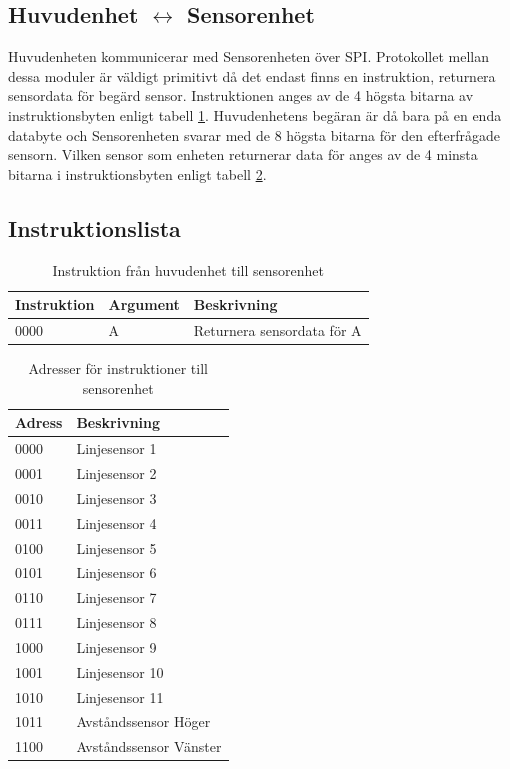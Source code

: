 \subsection{Huvudenhet $\longleftrightarrow$ Sensorenhet}

Huvudenheten kommunicerar med Sensorenheten över SPI. Protokollet mellan dessa moduler är väldigt primitivt då det endast finns en instruktion, returnera sensordata för begärd sensor. Instruktionen anges av de 4 högsta bitarna av instruktionsbyten enligt tabell \ref{protokoll:huvud-sensor}. Huvudenhetens begäran är då bara på en enda databyte och Sensorenheten svarar med de 8 högsta bitarna för den efterfrågade sensorn. Vilken sensor som enheten returnerar data för anges av de 4 minsta bitarna i instruktionsbyten enligt tabell \ref{protokoll:huvud-sensor-adress}.

\subsection{Instruktionslista}

\begin{table}[h!]
	\centering
	\begin{tabularx}{\textwidth}{| l | l | X |}
		\hline
		\textbf{Instruktion} & \textbf{Argument} & \textbf{Beskrivning} \\\hline
		{0000} & {A} & {Returnera sensordata för A} \\\hline
	\end{tabularx}
	\caption{Instruktion från huvudenhet till sensorenhet} \label{protokoll:huvud-sensor}
\end{table}

\begin{table}[h!]
	\centering
	\begin{tabularx}{\textwidth}{| l | X |}
		\hline
		\textbf{Adress} & \textbf{Beskrivning} \\\hline
		{0000} & {Linjesensor 1} \\\hline
		{0001} & {Linjesensor 2} \\\hline
		{0010} & {Linjesensor 3} \\\hline
		{0011} & {Linjesensor 4} \\\hline
		{0100} & {Linjesensor 5} \\\hline
		{0101} & {Linjesensor 6} \\\hline
		{0110} & {Linjesensor 7} \\\hline
		{0111} & {Linjesensor 8} \\\hline
		{1000} & {Linjesensor 9} \\\hline
		{1001} & {Linjesensor 10} \\\hline
		{1010} & {Linjesensor 11} \\\hline
		{1011} & {Avståndssensor Höger} \\\hline
		{1100} & {Avståndssensor Vänster} \\\hline
	\end{tabularx}
	\caption{Adresser för instruktioner till sensorenhet} \label{protokoll:huvud-sensor-adress}
\end{table}
